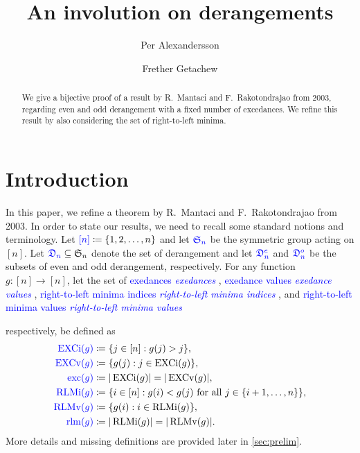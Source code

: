 \documentclass[reqno]{amsart}
\title{An involution on derangements}
\author[Per Alexandersson]{Per Alexandersson}
\author[Frether Getachew]{Frether Getachew}
\theoremstyle{definition}
\newcommand{\defin}[1]{%
\relax\ifmmode%
\textcolor{blue}{#1}%
\else\textcolor{blue}{\emph{#1}}%
\fi%
}
\newcommand{\symS}{\mathfrak{S}}
\newcommand{\dArr}{\mathfrak{D}}
\DeclareMathOperator{\exc}{exc}
\DeclareMathOperator{\EXCi}{EXCi}
\DeclareMathOperator{\EXCv}{EXCv}
\DeclareMathOperator{\rlm}{rlm}
\DeclareMathOperator{\RLMv}{RLMv}
\DeclareMathOperator{\RLMi}{RLMi}
\begin{document}
\begin{abstract}
 We give a bijective proof of a result by R.~Mantaci and F.~Rakotondrajao from 2003,
 regarding even and odd derangement with a fixed number of excedances.
 We refine this result by also considering the set of right-to-left minima.
\end{abstract}

\maketitle 

\section{Introduction}

In this paper, we refine a theorem by R.~Mantaci and F.~Rakotondrajao from 2003. 
In order to state our results, we need to recall some standard notions and terminology.
%
Let $\defin{[n]} \coloneqq \{1,2,\dotsc,n\}$ and let $\defin{\symS_n}$
be the symmetric group acting on $[n]$.
Let $\defin{\dArr_n} \subseteq \symS_n$ denote the set of derangement
and let $\defin{\dArr^e_n}$ and $\defin{\dArr^o_n}$ be the subsets
of even and odd derangement, respectively.
%
For any function $g:[n]\longrightarrow [n]$, let 
the set of \defin{exedances}, \defin{exedance values},
\defin{right-to-left minima indices}, and \defin{right-to-left minima values}
respectively, be defined as 
\begin{align*}
\defin{\EXCi(g)} &\coloneqq \{ j \in [n] : g(j)>j \}, \\
\defin{\EXCv(g)} &\coloneqq \{ g(j) : j \in \EXCi(g) \}, \\
\defin{\exc(g)} &\coloneqq |\EXCi(g)| = |\EXCv(g)|, \\
\defin{\RLMi(g)} &\coloneqq  \{i\in [n]: g(i)<g(j) \text{ for all } j\in \{i+1,\dotsc,n\} \},\\
\defin{\RLMv(g)}  &\coloneqq  \{ g(i) : i \in \RLMi(g)\}, \\
\defin{\rlm(g)} &\coloneqq |\RLMi(g)| = |\RLMv(g)| .
\end{align*}
More details and missing definitions are provided later in \cref{sec:prelim}.
\end{document}
